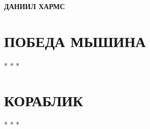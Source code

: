 \documentclass[12pt]{article}
\begin{document}
\begin{center} 
    \textbf{\LARGE{ДАНИИЛ ХАРМС}} 
\end{center}

\section*{\centering \textbf{\normalsize{ПОБЕДА МЫШИНА}}}


\begin{center} 
    \normalsize{* * *}
\end{center}

\section*{\centering \textbf{\normalsize{КОРАБЛИК}}}


\begin{center} 
    \normalsize{* * *}
\end{center}


\end{document}
